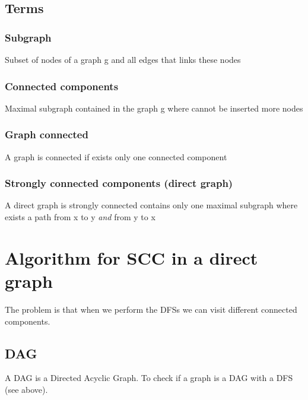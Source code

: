 \documentclass[10pt,a4paper]{book}
\begin{document}
			\section{Terms}
			\subsection{Subgraph}
			Subset of nodes of a graph g and all edges that links these nodes
			\subsection{Connected components}
			Maximal subgraph contained in the graph g where cannot be inserted more nodes
			\subsection{Graph connected}
		 A graph is connected if exists only one connected component
		 \subsection{Strongly connected components (direct graph)}
		 A direct graph is strongly connected contains only one maximal subgraph where exists a path from x to y \textit{and} from y to x
			\chapter{Algorithm for SCC in a direct graph}
			The problem is that when we perform the DFSs we can visit different connected components.
			\section{DAG}
			A DAG is a Directed Acyclic Graph. To check if a graph is a DAG with a DFS (see above).\\
\end{document}
